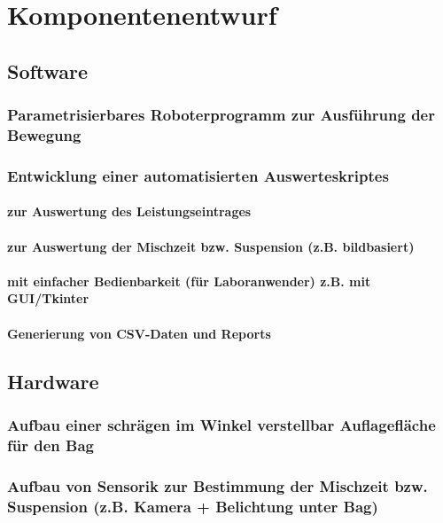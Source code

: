 \chapter{Komponentenentwurf}
\section{Software}
\subsection{Parametrisierbares Roboterprogramm zur Ausführung der Bewegung}
\subsection{Entwicklung einer automatisierten Auswerteskriptes}
\subsubsection{zur Auswertung des Leistungseintrages}
\subsubsection{zur Auswertung der Mischzeit bzw. Suspension (z.B. bildbasiert)}
\subsubsection{mit einfacher Bedienbarkeit (für Laboranwender) z.B. mit GUI/Tkinter}
\subsubsection{Generierung von CSV-Daten und Reports}
\section{Hardware}
\subsection{Aufbau einer schrägen im Winkel verstellbar Auflagefläche für den Bag}
\subsection{Aufbau von Sensorik zur Bestimmung der Mischzeit bzw. Suspension (z.B. Kamera + Belichtung unter Bag)}